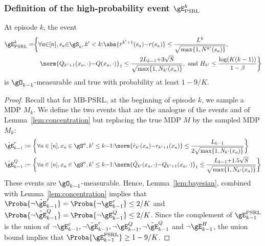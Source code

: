 \begin{subappendices}
\subsubsection{Definition of the high-probability event $\gE_\text{PSRL}^{k}$}

\begin{lem}
    \label{lem:concentration_psrl}
    At episode $k$, the event
    \begin{align*}
        \gE_\text{PSRL}^{k} = &\bigg\{ \forall a{\in}[n], s_a{\in}\gS_a, k'< k{:}
            \abs{r^{k'+1}(s_a){-}r(s_a)} \le\frac{L^{k}}{\sqrt{\max\{1,N^{k'}(s_a)\} }}, \\
            &\quad\norm{Q_{k'+1}(x_a,\cdot) {-}Q(x_a,\cdot)}_1 \le\frac{2L_{k-1}{+}3\sqrt{S}}{\sqrt{\max\{1,N_{k'}(x_a)\} }}, \text{ and } H_{k'}\le \frac{\log(K(k-1))}{1-\beta} \bigg\}
    \end{align*}
    is $\gO_{k-1}$-measurable and true with probability at least $1-9/K$.
\end{lem}

\begin{proof}
    Recall that for MB-PSRL, at the beginning of episode $k$, we sample a MDP $M_{k}$. We define the two events that are the analogue of the events  and  of Lemma~\ref{lem:concentration} but replacing the true MDP $M$ by the sampled MDP $M_{k}$: 
    \begin{align*}
        &\tilde{\gE}_{k-1}^r:= \bigg\{\forall a\in[n], x_a\in\gS^a, k'\le k{-}1{:} \norm{\hat{r}_{k'}(x_a){-}r_{k'+1}(x_a)} \le \frac{L_{k-1}}{2\sqrt{\max\{1,N_{k'}(x_a)\} }}\bigg\} \\
        &\tilde{\gE}_{k-1}^Q:= \bigg\{\forall a\in[n], x_a\in\gS^a, k'\le k{-}1{:} \norm{\hat{Q}_{k'}(x_a,\cdot){-}Q_{k'+1}(x_a, \cdot)}_1 \le \frac{L_{k-1}{+}1.5\sqrt{S}}{\sqrt{\max\{1,N_{k'}(x_a)\} }}\bigg\} 
    \end{align*}
    These events are $\gO_{k-1}$-measurable. Hence, Lemma~\ref{lem:bayesian}, combined with Lemma~\ref{lem:concentration} implies that $\Proba{ \lnot \tilde{\gE}_{k-1}^r} =\Proba{ \lnot \gE_{k-1}^r}\le 2/K$ and $\Proba{\lnot \tilde{\gE}_{k-1}^Q}=\Proba{ \lnot \gE_{k-1}^Q}\le 2/K$. Since the complement of $\gE_{k-1}^\text{PSRL}$ is the union of $\lnot \gE_{k-1}^r, \lnot \tilde{\gE}_{k-1}^r, \lnot \gE_{k-1}^Q, \lnot \tilde{\gE}_{k-1}^Q$ and $\lnot \gE_{k-1}^H$, the union bound implies that $\Proba{\gE^\text{PSRL}_{k-1}}\ge1-9/K$.
\end{proof}


\end{subappendices}

